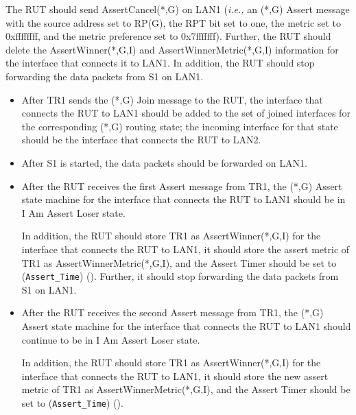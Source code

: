 \documentclass[11pt]{report}
\newcommand{\ie}{\emph{i.e.,}\xspace}
\begin{document}
\begin{itemize}
  The RUT should send AssertCancel(*,G) on LAN1 (\ie an (*,G) Assert message
  with the source address set to RP(G), the RPT bit set to one, the metric set
  to 0xffffffff, and the metric preference set to 0x7fffffff).
  Further, the RUT should delete the AssertWinner(*,G,I) and
  AssertWinnerMetric(*,G,I) information for the interface that connects it to
  LAN1.
  In addition, the RUT should stop forwarding the data packets from S1 on LAN1.

\end{itemize}


\begin{itemize}

  \item After TR1 sends the (*,G) Join message to the RUT, the interface that
  connects the RUT to LAN1 should be added to the set of joined interfaces for
  the corresponding (*,G) routing state; the incoming interface for that state
  should be the interface that connects the RUT to LAN2.

  \item After S1 is started, the data packets should be forwarded on LAN1.

  \item After the RUT receives the first Assert message from TR1, the (*,G)
  Assert state machine for the interface that connects the RUT to LAN1 should
  be in I Am Assert Loser state.

  In addition, the RUT should store TR1 as AssertWinner(*,G,I) for the
  interface that connects the RUT to LAN1, it should store the assert metric
  of TR1 as AssertWinnerMetric(*,G,I), and the Assert Timer should be set to
  (\verb=Assert_Time=) ({\PimsmAssertTime}).
  Further, it should stop forwarding the data packets from S1 on LAN1.

  \item After the RUT receives the second Assert message from TR1, the (*,G)
  Assert state machine for the interface that connects the RUT to LAN1 should
  continue to be in I Am Assert Loser state.

  In addition, the RUT should store TR1 as AssertWinner(*,G,I) for the
  interface that connects the RUT to LAN1, it should store the new assert
  metric of TR1 as AssertWinnerMetric(*,G,I), and the Assert Timer should be
  set to (\verb=Assert_Time=) ({\PimsmAssertTime}).

\end{itemize}
\end{document}
